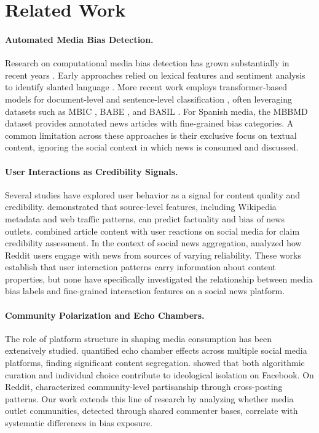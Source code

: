\section{Related Work}
\label{sec:related_work}

\paragraph{Automated Media Bias Detection.}
Research on computational media bias detection has grown substantially in recent years \cite{hamborg2019automated, rodrigo2024systematic}.
Early approaches relied on lexical features and sentiment analysis to identify slanted language \cite{recasens2013linguistic}.
More recent work employs transformer-based models for document-level \cite{baly2020detect} and sentence-level classification \cite{lei2022sentence}, often leveraging datasets such as MBIC \cite{spinde2021mbic}, BABE \cite{spinde2021neural}, and BASIL \cite{fan2019plain}.
For Spanish media, the MBBMD dataset \cite{rodrigo2025mbbmd} provides annotated news articles with fine-grained bias categories.
A common limitation across these approaches is their exclusive focus on textual content, ignoring the social context in which news is consumed and discussed.

\paragraph{User Interactions as Credibility Signals.}
Several studies have explored user behavior as a signal for content quality and credibility.
\citet{baly2018predicting} demonstrated that source-level features, including Wikipedia metadata and web traffic patterns, can predict factuality and bias of news outlets.
\citet{popat2018declare} combined article content with user reactions on social media for claim credibility assessment.
In the context of social news aggregation, \citet{glenski2017consumers} analyzed how Reddit users engage with news from sources of varying reliability.
These works establish that user interaction patterns carry information about content properties, but none have specifically investigated the relationship between media bias labels and fine-grained interaction features on a social news platform.

\paragraph{Community Polarization and Echo Chambers.}
The role of platform structure in shaping media consumption has been extensively studied.
\citet{cinelli2021echo} quantified echo chamber effects across multiple social media platforms, finding significant content segregation.
\citet{bakshy2015exposure} showed that both algorithmic curation and individual choice contribute to ideological isolation on Facebook.
On Reddit, \citet{soliman2019characterization} characterized community-level partisanship through cross-posting patterns.
Our work extends this line of research by analyzing whether media outlet communities, detected through shared commenter bases, correlate with systematic differences in bias exposure.

